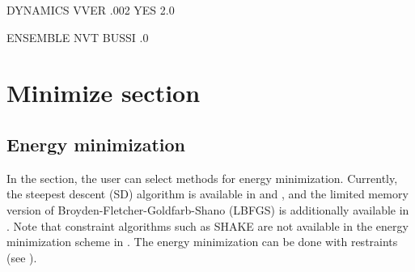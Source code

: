 \documentclass[a4paper,11pt,oneside,english]{sphinxmanual}
\begin{document}
\begin{sphinxVerbatim}[commandchars=\\\{\}]
\PYG{o}{[}DYNAMICS\PYG{o}{]}
          VVER   
                
           .002   
          
            YES   
        \PYGZhy{}2.0   
           

\PYG{o}{[}ENSEMBLE\PYG{o}{]}
          NVT      
         BUSSI    
       .0    
\end{sphinxVerbatim}


\chapter{Minimize section}
\label{\detokenize{07_Minimize:minimize-section}}\label{\detokenize{07_Minimize:minimize}}\label{\detokenize{07_Minimize::doc}}

\section{Energy minimization}
\label{\detokenize{07_Minimize:energy-minimization}}
In the \sphinxstylestrong{{[}MINIMIZE{]}} section, the user can select methods for energy minimization.
Currently, the steepest descent (SD) algorithm is available in  and ,
and the limited memory version of Broyden-Fletcher-Goldfarb-Shano (LBFGS)
is additionally available in .
Note that constraint algorithms such as SHAKE are not available
in the energy minimization scheme in .
The energy minimization can be done with restraints (see {\hyperref[\detokenize{12_Restraints:restraints}]{}}).
\end{document}

